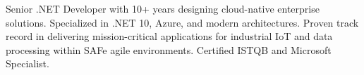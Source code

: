 \documentclass[9pt]{developercv}
\begin{document}

\begin{minipage}[t]{0.9\textwidth} %
	\vspace{-\baselineskip} %
	
	Senior .NET Developer with 10+ years designing cloud-native enterprise solutions. Specialized in .NET 10, Azure, and modern architectures. Proven track record in delivering mission-critical applications for industrial IoT and data processing within SAFe agile environments. Certified ISTQB and Microsoft Specialist.


\end{minipage}
\hfill %



\end{document}
